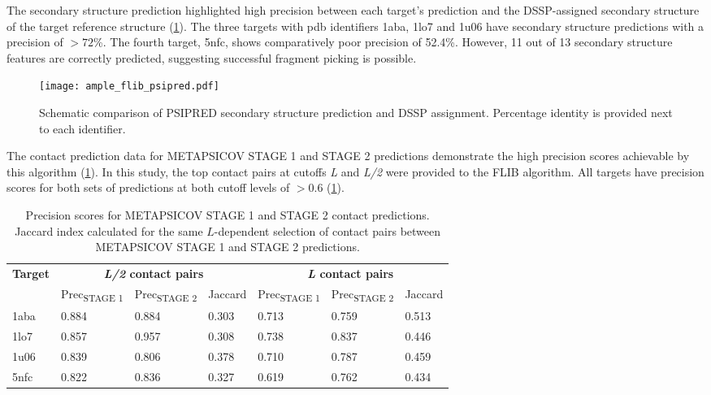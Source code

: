 The secondary structure prediction highlighted high precision between each target's prediction and the DSSP-assigned \cite{Frishman1995-ns} secondary structure of the target reference structure (\cref{fig:ample_flib_psipred}). The three targets with \gls{pdb} identifiers 1aba, 1lo7 and 1u06 have secondary structure predictions with a precision of $>72$\%. The fourth target, 5nfc, shows comparatively poor precision of 52.4\%. However, 11 out of 13 secondary structure features are correctly predicted, suggesting successful fragment picking is possible.

\begin{figure}[H]
	\centering
	\texttt{[image: ample\_flib\_psipred.pdf]}
	\caption[PSIPRED schema for FLIB targets]{Schematic comparison of PSIPRED \cite{Jones1999-fi} secondary structure prediction and DSSP \cite{Frishman1995-ns} assignment. Percentage identity is provided next to each identifier.}
	\label{fig:ample_flib_psipred}
\end{figure}

The contact prediction data for METAPSICOV STAGE 1 and STAGE 2 predictions demonstrate the high precision scores achievable by this algorithm (\cref{table:ample_flib_contact_precision}). In this study, the top contact pairs at cutoffs \textit{L} and \textit{L/2} were provided to the FLIB algorithm. All targets have precision scores for both sets of predictions at both cutoff levels of $>0.6$ (\cref{table:ample_flib_contact_precision}).

\begin{table}[H]
  \small
  \centering
  \caption[Contact prediction summary for FLIB targets]{Precision scores for METAPSICOV \cite{Jones2015-wp} STAGE 1 and STAGE 2 contact predictions. Jaccard index calculated for the same $L$-dependent selection of contact pairs between METAPSICOV STAGE 1 and STAGE 2 predictions.}
  \label{table:ample_flib_contact_precision}
  \begin{tabularx}{\textwidth}{X X X X X X X}
      \hline
	  \multirow{2}{*}{\textbf{Target}} & \multicolumn{3}{c}{\textbf{\textit{L/2} contact pairs}} & \multicolumn{3}{c}{\textbf{\textit{L} contact pairs}} 	\\ \cline{2-7}
	  							&  	Prec\textsubscript{STAGE 1}	& 	Prec\textsubscript{STAGE 2}	& 	Jaccard 	& 	Prec\textsubscript{STAGE 1} 	& 	Prec\textsubscript{STAGE 2} 	& 	Jaccard	 	\\
	  \hline
	  1aba						&	0.884	&	0.884	&	0.303	&	0.713	&	0.759	&	0.513		\\
	  1lo7						&	0.857	&	0.957	&	0.308	&	0.738	&	0.837	&	0.446		\\
	  1u06						&	0.839	&	0.806	&	0.378	&	0.710	&	0.787	&	0.459		\\
	  5nfc						&	0.822	&	0.836	&	0.327	&	0.619	&	0.762	&	0.434		\\ 
	  \hline
  \end{tabularx}
\end{table}

